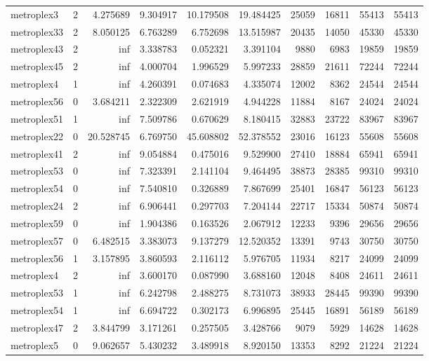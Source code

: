 \begin{longtable}{|l|r|r|r|r|r|r|r|r|r|}
metroplex3 & 2 & 4.275689 & 9.304917 & 10.179508 & 19.484425 & 25059 & 16811 & 55413 & 55413 \\
metroplex33 & 2 & 8.050125 & 6.763289 & 6.752698 & 13.515987 & 20435 & 14050 & 45330 & 45330 \\
metroplex43 & 2 & inf & 3.338783 & 0.052321 & 3.391104 & 9880 & 6983 & 19859 & 19859 \\
metroplex45 & 2 & inf & 4.000704 & 1.996529 & 5.997233 & 28859 & 21611 & 72244 & 72244 \\
metroplex4 & 1 & inf & 4.260391 & 0.074683 & 4.335074 & 12002 & 8362 & 24544 & 24544 \\
metroplex56 & 0 & 3.684211 & 2.322309 & 2.621919 & 4.944228 & 11884 & 8167 & 24024 & 24024 \\
metroplex51 & 1 & inf & 7.509786 & 0.670629 & 8.180415 & 32883 & 23722 & 83967 & 83967 \\
metroplex22 & 0 & 20.528745 & 6.769750 & 45.608802 & 52.378552 & 23016 & 16123 & 55608 & 55608 \\
metroplex41 & 2 & inf & 9.054884 & 0.475016 & 9.529900 & 27410 & 18884 & 65941 & 65941 \\
metroplex53 & 0 & inf & 7.323391 & 2.141104 & 9.464495 & 38873 & 28385 & 99310 & 99310 \\
metroplex54 & 0 & inf & 7.540810 & 0.326889 & 7.867699 & 25401 & 16847 & 56123 & 56123 \\
metroplex24 & 2 & inf & 6.906441 & 0.297703 & 7.204144 & 22717 & 15334 & 50874 & 50874 \\
metroplex59 & 0 & inf & 1.904386 & 0.163526 & 2.067912 & 12233 & 9396 & 29656 & 29656 \\
metroplex57 & 0 & 6.482515 & 3.383073 & 9.137279 & 12.520352 & 13391 & 9743 & 30750 & 30750 \\
metroplex56 & 1 & 3.157895 & 3.860593 & 2.116112 & 5.976705 & 11934 & 8217 & 24099 & 24099 \\
metroplex4 & 2 & inf & 3.600170 & 0.087990 & 3.688160 & 12048 & 8408 & 24611 & 24611 \\
metroplex53 & 1 & inf & 6.242798 & 2.488275 & 8.731073 & 38933 & 28445 & 99390 & 99390 \\
metroplex54 & 1 & inf & 6.694722 & 0.302173 & 6.996895 & 25445 & 16891 & 56189 & 56189 \\
metroplex47 & 2 & 3.844799 & 3.171261 & 0.257505 & 3.428766 & 9079 & 5929 & 14628 & 14628 \\
metroplex5 & 0 & 9.062657 & 5.430232 & 3.489918 & 8.920150 & 13353 & 8292 & 21224 & 21224 \\

\end{longtable}
